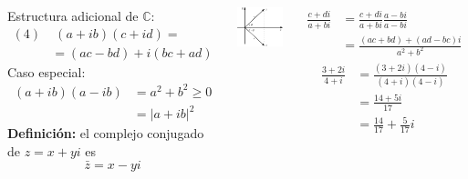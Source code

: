 \documentclass[9pt, aspectratio=169]{beamer}
\begin{document}
\begin{frame}
 \begin{columns}[t]
  Estructura adicional de $\mathbb{C}$:
  \begin{align*}
   (4)&\; (a + ib)(c + id) = \\
   &= (ac - bd) + i (bc + ad)
  \end{align*}
  Caso especial:
  \begin{align*}
   (a + ib)(a - ib) &= a^2 + b^2 \geq 0 \\
   &= |a + i b|^2
  \end{align*}
  \textbf{Definición:} el complejo conjugado de $z = x + y i$ es
  \[ \bar{z} = x - y i \]
    \begin{center}
    \includegraphics[scale=0.25]{figs/conjugado.pdf}
    \end{center}
  
  \begin{align*}
   \frac{c + di}{a + bi} &= \frac{c + di}{a + bi} \frac{a - bi}{a - bi} \\
   &= \frac{(ac + bd) + (ad - bc)i}{a^2 + b^2}
  \end{align*}
  \begin{align*}
   \frac{3 + 2 i}{4 + i} &= \frac{(3 + 2i)(4 - i)}{(4 + i)(4 - i)} \\
   &= \frac{14 + 5 i}{17} \\
   &= \frac{14}{17} + \frac{5}{17}i
  \end{align*}
  

\end{columns}
\end{frame}
\end{document}

